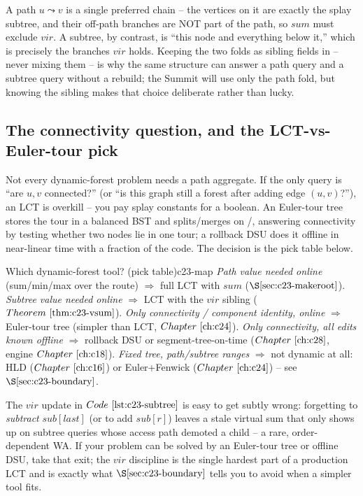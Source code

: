 \begin{insightbox}
A path \(u\leadsto v\) is a single preferred chain -- the vertices on it are exactly
the splay subtree, and their off-path branches are NOT part of the path, so
\(\mathit{sum}\) must exclude \(\mathit{vir}\). A subtree, by contrast, is ``this
node and everything below it,'' which is precisely the branches \(\mathit{vir}\)
holds. Keeping the two folds as sibling fields in  -- never mixing them --
is why the same structure can answer a path query and a subtree query without a
rebuild; the Summit will use only the path fold, but knowing the sibling makes that
choice deliberate rather than lucky.
\end{insightbox}

\subsection*{The connectivity question, and the LCT-vs-Euler-tour pick}

Not every dynamic-forest problem needs a path aggregate. If the only query is
``are \(u,v\) connected?'' (or ``is this graph still a forest after adding edge
\((u,v)\)?''), an LCT is overkill -- you pay splay constants for a boolean. An
Euler-tour tree stores the tour in a balanced BST and splits/merges on
/, answering connectivity by testing whether two nodes lie in
one tour; a rollback DSU does it offline in near-linear time with a fraction of the
code. The decision is the pick table below.

\begin{definition}{Which dynamic-forest tool? (pick table)}{c23-map}
\emph{Path value needed online} (sum/min/max over the route) \(\Rightarrow\) full LCT
with \(\mathit{sum}\) (\(\secref{c23-makeroot}\)). \emph{Subtree value needed online}
\(\Rightarrow\) LCT with the \(\mathit{vir}\) sibling (\(\thmref{c23-vsum}\)). \emph{Only
connectivity / component identity, online} \(\Rightarrow\) Euler-tour tree (simpler
than LCT, \(\chref{c24}\)). \emph{Only connectivity, all edits known offline}
\(\Rightarrow\) rollback DSU or segment-tree-on-time (\(\chref{c28}\), engine
\(\chref{c18}\)). \emph{Fixed tree, path/subtree ranges} \(\Rightarrow\) not dynamic at
all: HLD (\(\chref{c16}\)) or Euler+Fenwick (\(\chref{c24}\)) -- see
\(\secref{c23-boundary}\).
\end{definition}

\begin{warningbox}
The \(\mathit{vir}\) update in \(\coderef{c23-subtree}\) is easy to get subtly wrong:
forgetting to \emph{subtract} \(\mathit{sub}[\mathit{last}]\) (or to add
\(\mathit{sub}[r]\)) leaves a stale virtual sum that only shows up on subtree queries
whose access path demoted a child -- a rare, order-dependent WA. If your problem can
be solved by an Euler-tour tree or offline DSU, take that exit; the \(\mathit{vir}\)
discipline is the single hardest part of a production LCT and is exactly what
\(\secref{c23-boundary}\) tells you to avoid when a simpler tool fits.
\end{warningbox}

